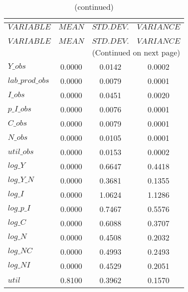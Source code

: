  
\begin{center}
\begin{longtable}{lccc} 
\caption{THEORETICAL MOMENTS}\\
 \label{Table:th_moments}\\
\toprule 
$VARIABLE        $	 & 	 $         MEAN$	 & 	 $    STD. DEV.$	 & 	 $     VARIANCE$\\
\midrule \endfirsthead 
\caption{(continued)}\\
 \toprule \\ 
$VARIABLE        $	 & 	 $         MEAN$	 & 	 $    STD. DEV.$	 & 	 $     VARIANCE$\\
\midrule \endhead 
\midrule \multicolumn{4}{r}{(Continued on next page)} \\ \bottomrule \endfoot 
\bottomrule \endlastfoot 
$Y\_obs          $	 & 	       0.0000	 & 	       0.0142	 & 	       0.0002 \\ 
$lab\_prod\_obs  $	 & 	       0.0000	 & 	       0.0079	 & 	       0.0001 \\ 
$I\_obs          $	 & 	       0.0000	 & 	       0.0451	 & 	       0.0020 \\ 
$p\_I\_obs       $	 & 	       0.0000	 & 	       0.0076	 & 	       0.0001 \\ 
$C\_obs          $	 & 	       0.0000	 & 	       0.0079	 & 	       0.0001 \\ 
$N\_obs          $	 & 	       0.0000	 & 	       0.0105	 & 	       0.0001 \\ 
$util\_obs       $	 & 	       0.0000	 & 	       0.0153	 & 	       0.0002 \\ 
$log\_Y          $	 & 	       0.0000	 & 	       0.6647	 & 	       0.4418 \\ 
$log\_Y\_N       $	 & 	       0.0000	 & 	       0.3681	 & 	       0.1355 \\ 
$log\_I          $	 & 	       0.0000	 & 	       1.0624	 & 	       1.1286 \\ 
$log\_p\_I       $	 & 	       0.0000	 & 	       0.7467	 & 	       0.5576 \\ 
$log\_C          $	 & 	       0.0000	 & 	       0.6088	 & 	       0.3707 \\ 
$log\_N          $	 & 	       0.0000	 & 	       0.4508	 & 	       0.2032 \\ 
$log\_NC         $	 & 	       0.0000	 & 	       0.4993	 & 	       0.2493 \\ 
$log\_NI         $	 & 	       0.0000	 & 	       0.4529	 & 	       0.2051 \\ 
${util}          $	 & 	       0.8100	 & 	       0.3962	 & 	       0.1570 \\ 
\end{longtable}
 \end{center}
